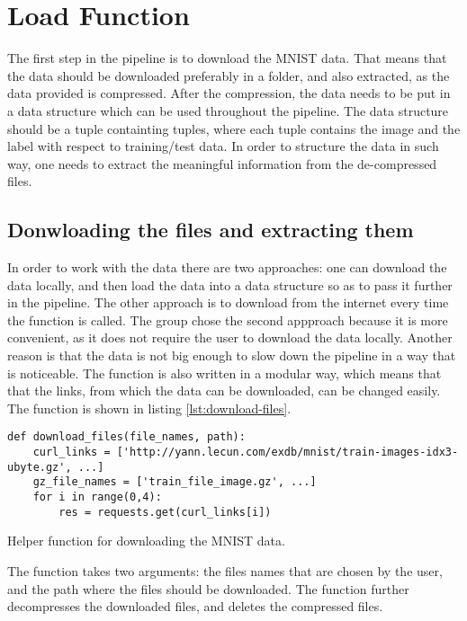\section{Load Function}\label{sec:load-function}
The first step in the pipeline is to download the MNIST data. That means that the data should be downloaded preferably in a folder, and also extracted, as the data provided is compressed. After the compression, the data needs to be put in a data structure which can be used throughout the pipeline. The data structure should be a tuple containting tuples, where each tuple contains the image and the label with respect to training/test data. In order to structure the data in such way, one needs to extract the meaningful information from the de-compressed files.

\subsection{Donwloading the files and extracting them}\label{subsec:download-files}
In order to work with the data there are two approaches: one can download the data locally, and then load the data into a data structure so as to pass it further in the pipeline. The other approach is to download from the internet every time the function is called. The group chose the second appproach because it is more convenient, as it does not require the user to download the data locally. Another reason is that the data is not big enough to slow down the pipeline in a way that is noticeable. The function is also written in a modular way, which means that that the links, from which the data can be downloaded, can be changed easily. The function is shown in listing \ref{lst:download-files}.

\begin{listing}[!ht]
\begin{verbatim}          
def download_files(file_names, path):
    curl_links = ['http://yann.lecun.com/exdb/mnist/train-images-idx3-ubyte.gz', ...]
    gz_file_names = ['train_file_image.gz', ...]
    for i in range(0,4):
        res = requests.get(curl_links[i])
\end{verbatim}
\caption{Helper function for downloading the MNIST data.}
\label{lst:download-files}
\end{listing}


The function takes two arguments: the files names that are chosen by the user, and the path where the files should be downloaded. The function further decompresses the downloaded files, and deletes the compressed files.

